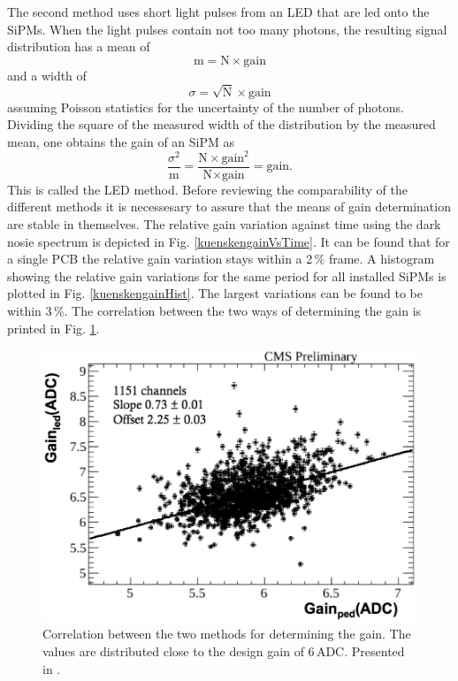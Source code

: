 The second method uses short light pulses from an LED that are led onto the SiPMs. When the light pulses contain not too many photons, the resulting signal distribution has a mean of
\begin{equation}
\text{m}=\text{N}\times \text{gain}
\end{equation}
and a width of
\begin{equation}
\sigma=\sqrt{\text{N}}\times \text{gain}
\end{equation}
assuming Poisson statistics for the uncertainty of the number of photons. Dividing the square of the measured width of the distribution by the measured mean, one obtains the gain of an SiPM as
\begin{equation}
\frac{\sigma^2}{\text{m}}=\frac{\text{N}\times \text{gain}^2}{\text{N}\times \text{gain}}=\text{gain.}
\end{equation}
This is called the LED method.
Before reviewing the comparability of the different methods it is necessesary to assure that the means of gain determination are stable in themselves. The relative gain variation against time using the dark nosie spectrum is depicted in Fig. \ref{kuenskengainVsTime}. It can be found that for a single PCB the relative gain variation stays within a 2\,\% frame. A histogram showing the relative gain variations for the same period for all installed SiPMs is plotted in Fig. \ref{kuenskengainHist}. The largest variations can be found to be within 3\,\%. The correlation between the two ways of determining the gain is printed in Fig. \ref{kuenskengainCorr}.
\begin{figure}[b]
\centering
\begin{minipage}[b]{0.475\textwidth}
\includegraphics[width=\textwidth]{Figures/kuensken/gainCorrelation.png}
\end{minipage}
\hspace{0.5cm}
\begin{minipage}[b]{0.475\textwidth}
\caption{Correlation between the two methods for determining the gain. The values are distributed close to the design gain of 6\,ADC. Presented in \cite{kuenskenCalor}.}
\label{kuenskengainCorr}
\end{minipage}
\end{figure}
